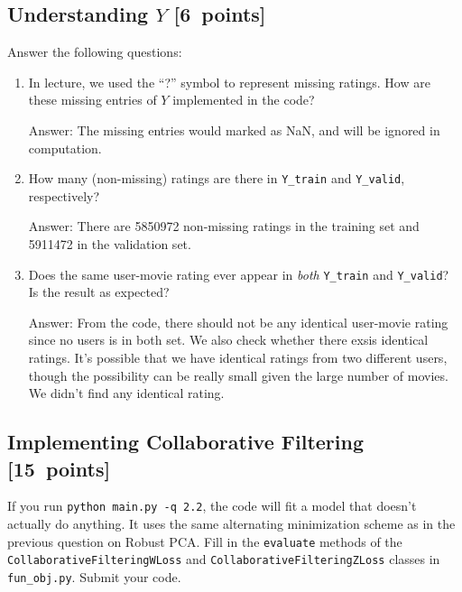 \documentclass{article}
\newcommand{\blu}[1]{{\textcolor{blu}{#1}}}
\newenvironment{answer}{\par\begingroup\color{gre}Answer: }{\endgroup}
\let\ask\blu
\newcommand\pts[1]{\textcolor{pointscolour}{[#1~points]}}
\begin{document}
\subsection{Understanding $Y$ \pts{6}}

\ask{Answer the following questions:}

\begin{enumerate}
\item In lecture, we used the ``?'' symbol to represent missing ratings. How are these missing entries of $Y$ implemented in the code?
\begin{answer}
	The missing entries would marked as NaN, and will be ignored in computation.
\end{answer}
\item How many (non-missing) ratings are there in \texttt{Y\_train} and \texttt{Y\_valid}, respectively?
\begin{answer}
	There are 5850972 non-missing ratings in the training set and 5911472 in the validation set. 
\end{answer}
\item Does the same user-movie rating ever appear in \emph{both} \texttt{Y\_train} and \texttt{Y\_valid}? Is the result as expected?
\begin{answer}
	From the code, there should not be any identical user-movie rating since no users is in both set. We also check whether there exsis identical ratings. It's possible that we have identical ratings from two different users, though the possibility can be really small given the large number of movies. We didn't find any identical rating.
\end{answer}
\end{enumerate}


\subsection{Implementing Collaborative Filtering \pts{15}}

If you run \texttt{python main.py -q 2.2}, the code will fit a model that doesn't actually do anything. It uses the same alternating minimization scheme as in the previous question on Robust PCA. \ask{Fill in the \texttt{evaluate} methods of the \texttt{CollaborativeFilteringWLoss} and \texttt{CollaborativeFilteringZLoss} classes in \texttt{fun\_obj.py}. Submit your code.}
\end{document}
